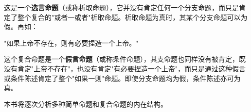 这是一个\textbf{选言命题}（或称析取命题），它并没有肯定任何一个分支命题，而只是肯定了整个复合的"或者一或者"析取命题。析取命题为真时，其某个分支命题可以为假。再如：

\begin{center}
"如果上帝不存在，则有必要捏造一个上帝。"\cite{voltaire1770}
\end{center}

这个复合命题是一个\textbf{假言命题}（或称条件命题），其支命题也同样没有被肯定，既没有肯定"上帝不存在"，也没有肯定"有必要捏造一个上帝"，而只是通过这种假言或条件陈述肯定了整个"如果一则"命题。即使分支命题均为假，条件陈述亦可为真。

\begin{center}
\end{center}

本书将逐次分析多种简单命题和复合命题的内在结构。 